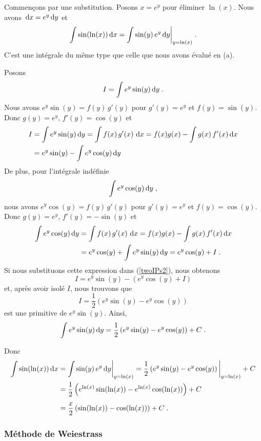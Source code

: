 {\begin{egg}
 Commençons par une substitution.  Posons $x = e^y$ pour
éliminer $\ln(x)$.  Nous avons $\,\mathrm{d}x = e^y \,\mathrm{d}y$ et
\[
\int \sin(\ln(x)) \,\mathrm{d}x = \int \sin(y) \, e^y \,\mathrm{d}y\bigg|_{y=\ln(x)} \; .
\]
C'est une intégrale du même type que celle que nous avons évalué en (a).

Posons
\[
I = \int e^y\sin(y) \,\mathrm{d}y \; .
\]
Nous avons $e^y \sin(y) = f(y)\,g'(y)$ pour $g'(y)=e^y$ et $f(y)=\sin(y)$.
Donc $g(y) = e^y$, $f'(y) = \cos(y)$ et
\begin{align}
I &= \int e^y\sin(y) \,\mathrm{d}y = \int f(x)\,g'(x)\,\,\mathrm{d}x
= f(x)g(x) - \int g(x)\,f'(x) \,\mathrm{d}x \nonumber \\
&= e^y\sin(y) - \int e^y \cos(y) \,\mathrm{d}y \label{twoIPs2}
\end{align}
De plus, pour l'intégrale indéfinie
\[
\int e^y \cos(y) \,\mathrm{d}y \; ,
\]
nous avons $e^y \cos(y) = f(y)\,g'(y)$ pour $g'(y)=e^y$ et
$f(y)=\cos(y)$.  Donc $g(y) = e^y$, $f'(y) = -\sin(y)$ et
\begin{align*}
\int e^y \cos(y) \,\mathrm{d}y &= \int f(x)\,g'(x)\,\,\mathrm{d}x
= f(x)g(x) - \int g(x)\,f'(x) \,\mathrm{d}x \\
&= e^y \cos(y) + \int e^y \sin(y) \,\mathrm{d}y
= e^y \cos(y) + I \; .
\end{align*}
Si nous substituons cette expression dans (\ref{twoIPs2}), nous obtenons
\[
I = e^y\sin(y) - \left( e^y \cos(y) + I \right)
\]
et, après avoir isolé $I$, nous trouvons que
\[
I = \frac{1}{2}\left(e^y\sin(y) - e^y \cos(y)\right)
\]
est une primitive de $e^y\sin(y)$.  Ainsi, 
\[
\int e^y\sin(y) \,\mathrm{d}y
= \frac{1}{2}\left(e^y\sin(y) - e^y \cos(y)\right) + C \; .
\]

Donc
\begin{align*}
\int \sin(\ln(x)) \,\mathrm{d}x &= \int \sin(y) \, e^y \,\mathrm{d}y\bigg|_{y=\ln(x)}
= \frac{1}{2}\left(e^y\sin(y) - e^y \cos(y)\right)\bigg|_{y=\ln(x)} + C \\
&= \frac{1}{2}\left(e^{\ln(x)}\sin(\ln(x))-e^{\ln(x)}
  \cos(\ln(x))\right) + C\\[1ex]
&= \frac{x}{2}\left(\sin(\ln(x))- \cos(\ln(x))\right) + C \; .
\end{align*}
\end{egg}

\subsubsection{Méthode de Weiestrass \eng}

}
